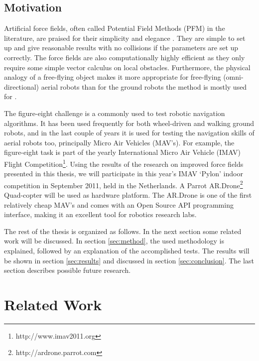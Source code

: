 \documentclass[11pt]{article}
\begin{document}
\subsection{Motivation}
\label{sec:motivation}


Artificial force fields, often called Potential Field Methods (PFM) in the literature, are praised for their simplicity and elegance \cite{koren}. They are simple to set up and give reasonable results with no collisions if the parameters are set up correctly. The force fields are also computationally highly efficient as they only require some simple vector calculus on local obstacles. Furthermore, the physical analogy of a free-flying object makes it more appropriate for free-flying (omni-directional) aerial robots than for the ground robots the method is mostly used for \cite{burgard99}. %

The figure-eight challenge is a commonly used to test robotic navigation algorithms. %
It has been used frequently for both wheel-driven and walking ground robots, and in the last couple of years it is used for testing the navigation skills of aerial robots too, principally Micro Air Vehicles (MAV's). For example, the figure-eight task is part of the yearly International Micro Air Vehicle (IMAV) Flight Competition\footnote{http://www.imav2011.org}. Using the results of the research on improved force fields presented in this thesis, we will participate in this year's IMAV `Pylon' indoor competition in September 2011, held in the Netherlands. A Parrot AR.Drone\footnote{http://ardrone.parrot.com} Quad-copter will be used as hardware platform. The AR.Drone is one of the first relatively cheap MAV's and comes with an Open Source API programming interface, making it an excellent tool for robotics research labs.

The rest of the thesis is organized as follows. In the next section some related work will be discussed. In section \ref{sec:method}, the used methodology is explained, followed by an explanation of the accomplished tests. The results will be shown in section \ref{sec:results} and discussed in section \ref{sec:conclusion}. The last section describes possible future research.


\section{Related Work}
\label{sec:related}
\end{document}
